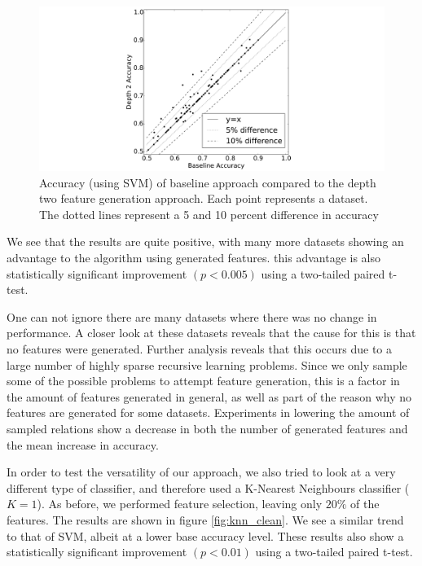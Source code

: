 \documentclass[twoside,11pt]{article}
\theoremstyle{definition}
\begin{document}
\begin{figure}[]
	\centering
	\includegraphics[width=\linewidth]{svm_full.pdf}
	\caption{Accuracy (using SVM) of baseline approach compared to the depth two feature generation approach. Each point represents a dataset. The dotted lines represent a 5 and 10 percent difference in accuracy}
	\label{fig:svm_regular}
\end{figure}

We see that the results are quite positive, with many more datasets showing an advantage to the algorithm using generated features. this advantage is also statistically significant improvement $(p<0.005)$ using a two-tailed paired t-test.

One can not ignore there are many datasets where there was no change in performance. A closer look at these datasets reveals that the cause for this is that  no features were generated. Further analysis reveals that this occurs due to a large number of highly sparse recursive learning problems. Since we only sample some of the possible problems to attempt feature generation, this is a factor in the amount of features generated in general, as well as part of the reason why no features are generated for some datasets. Experiments in lowering the amount of sampled relations show a decrease in both the number of generated features and the mean increase in accuracy.

In order to test the versatility of our approach, we also tried to look at a very different type of classifier, and therefore used a K-Nearest Neighbours \cite{fix1951discriminatory} classifier ($K=1$). As before, we performed feature selection, leaving only $20\%$ of the features. The results are shown in figure \ref{fig:knn_clean}. We see a similar trend to that of SVM, albeit at a lower base accuracy level. These results also show a statistically significant improvement $(p<0.01)$ using a two-tailed paired t-test.
\end{document}
